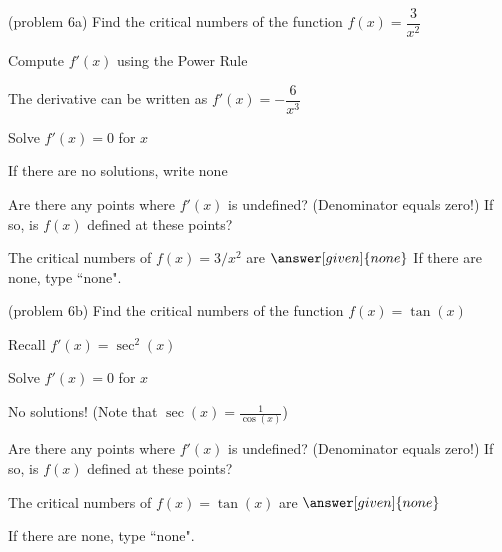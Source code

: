 \documentclass{ximera}
\begin{document}
\begin{problem}(problem 6a)
  Find the critical numbers of the function $f(x) = \dfrac{3}{x^2}$
  
  
    \begin{hint}
      Compute $f'(x)$ using the Power Rule
    \end{hint}
    \begin{hint}
      The derivative can be written as $f'(x) = -\dfrac{6}{x^3}$
    \end{hint}
		\begin{hint}
      Solve $f'(x) = 0$ for $x$
    \end{hint}
		\begin{hint}
      If there are no solutions, write none
    \end{hint}
    \begin{hint}
      Are there any points where $f'(x)$ is undefined? (Denominator equals zero!)
      If so, is $f(x)$ defined at these points?  
		\end{hint}
    
    
		The critical numbers of $f(x) = 3/x^2$ are
		 $\answer[given]{none}$
		If there are none, type ``none".
\end{problem}



\begin{problem}(problem 6b)
  Find the critical numbers of the function $f(x) = \tan(x)$
  
  
    \begin{hint}
      Recall $f'(x) = \sec^2(x)$
    \end{hint}
		\begin{hint}
      Solve $f'(x) = 0$ for $x$
    \end{hint}
		\begin{hint}
      No solutions! (Note that $\sec(x) = \frac{1}{\cos(x)}$)
    \end{hint}
    \begin{hint}
      Are there any points where $f'(x)$ is undefined? (Denominator equals zero!)
      If so, is $f(x)$ defined at these points?  
		\end{hint}
    
    
		The critical numbers of $f(x) = \tan(x)$ are
		 $\answer[given]{none}$
		
		If there are none, type ``none".
		
\end{problem}



\begin{center}
\begin{foldable}
\end{foldable}
\end{center}
\end{document}
